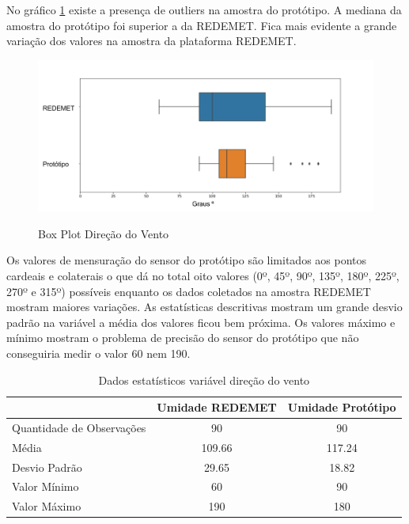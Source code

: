 No gráfico \ref{fig:box_plot_dirvento} existe a presença de outliers na amostra do protótipo. A mediana da amostra do protótipo foi superior a da REDEMET. Fica mais evidente a grande variação dos valores na amostra da plataforma REDEMET. 

\begin{figure} [!h]
    \centering
    \caption{Box Plot Direção do Vento}
    \includegraphics [scale = 0.5] {Figuras/box_plot_dirvento.png}
    \label{fig:box_plot_dirvento}
\end{figure}

Os valores de mensuração do sensor do protótipo são limitados aos pontos cardeais e colaterais o que dá no total oito valores (0º, 45º, 90º, 135º, 180º, 225º, 270º e 315º) possíveis enquanto os dados coletados na amostra REDEMET mostram maiores variações. As estatísticas descritivas mostram um grande desvio padrão na variável a média dos valores ficou bem próxima. Os valores máximo e mínimo mostram o problema de precisão do sensor do protótipo que não conseguiria medir o valor 60 nem 190.

\begin{table}[]
\centering
\begin{tabular}{l|c|c|}
\cline{2-3}
                                                & \multicolumn{1}{l|}{\textbf{Umidade REDEMET}} & \textbf{Umidade Protótipo} \\ \hline
\multicolumn{1}{|l|}{Quantidade de Observações} & 90                                            & 90                         \\ \hline
\multicolumn{1}{|l|}{Média}                     & 109.66                                        & 117.24                     \\ \hline
\multicolumn{1}{|l|}{Desvio Padrão}             & 29.65                                         & 18.82                      \\ \hline
\multicolumn{1}{|l|}{Valor Mínimo}              & 60                                            & 90                         \\ \hline
\multicolumn{1}{|l|}{Valor Máximo}              & 190                                           & 180                        \\ \hline
\end{tabular}
\caption{Dados estatísticos variável direção do vento}
\label{tab:est_desc_dirvento_prot}
\end{table}

